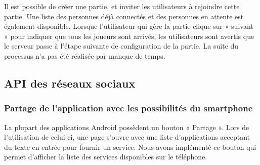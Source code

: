 \documentclass{report}
\begin{document}
Il est possible de créer une partie, et inviter les utilisateurs à
rejoindre cette partie. Une liste des personnes déjà connectés et des
personnes en attente est également disponible. Lorsque l’utilisateur qui
gère la partie clique sur « suivant » pour indiquer que tous les joueurs
sont arrivés, les utilisateurs sont avertis que le serveur passe à
l’étape suivante de configuration de la partie. La suite du processus
n’a pas été réalisée par manque de temps.

\subsection{API des réseaux sociaux}

\subsubsection{Partage de l’application avec les possibilités du smartphone}

La plupart des applications Android possèdent un bouton « Partage ».
Lors de l’utilisation de celui-ci, une page s’ouvre avec une liste
d’applications acceptant du texte en entrée pour fournir un service.
Nous avons implémenté ce bouton qui permet d’afficher la liste des
services disponibles sur le téléphone.
\bigskip
\end{document}

